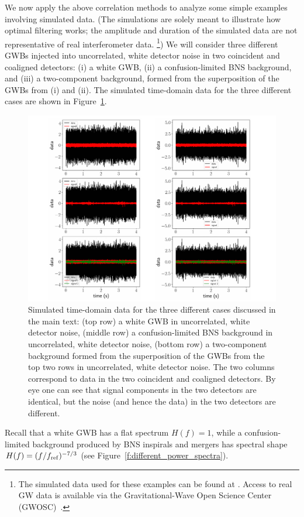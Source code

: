 We now apply the above correlation methods to analyze 
some simple examples involving simulated data.
(The simulations are solely meant to illustrate how 
optimal filtering works;
the amplitude and duration of the simulated data are 
not representative of real interferometer data.%
\footnote{The simulated data used for these examples 
can be found at \cite{github-code}.
Access to real GW data is available via the 
Gravitational-Wave Open Science Center (GWOSC)~\cite{gwosc}.})
We will consider three different GWBs injected into 
uncorrelated, white detector noise in two coincident
and coaligned detectors:
(i) a white GWB, 
(ii) a confusion-limited BNS background, 
and 
(iii) a two-component background, formed from the superposition
of the GWBs from (i) and (ii).
The simulated time-domain data for the three different 
cases are shown in Figure~\ref{f:simple_examples}.
%
\begin{figure}[htbp!]
\begin{center}
\includegraphics[width=\textwidth]{Figures/simple_examples}
\caption{Simulated time-domain data for the three different
cases discussed in the main text:
(top row) a white GWB in uncorrelated, white detector noise,
(middle row) a confusion-limited BNS background in uncorrelated, 
white detector noise,
(bottom row) a two-component background formed from the superposition 
of the GWBs from the top two rows in uncorrelated, white 
detector noise.
The two columns correspond to data in the two coincident
and coaligned detectors.
By eye one can see that signal components in the two detectors 
are identical, but the noise (and hence the data) in the two 
detectors are different.}
\label{f:simple_examples}
\end{center}
\end{figure}
%
Recall that a white GWB has a flat spectrum $H(f)=1$, 
while a confusion-limited background produced by BNS 
inspirals and mergers has spectral shape $H(f)=(f/f_{\rm ref})^{-7/3}$ 
(see Figure~\ref{f:different_power_spectra}).

